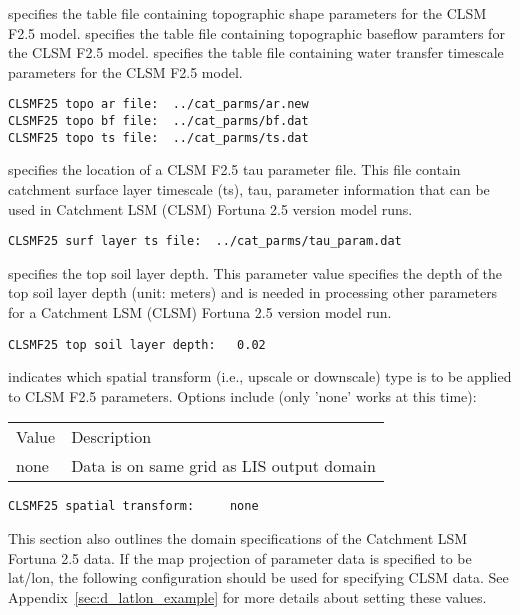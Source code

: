   specifies the table file containing 
   topographic shape parameters for the CLSM F2.5 model.
  specifies the table file containing
   topographic baseflow paramters for the CLSM F2.5 model.
  specifies the table file containing
   water transfer timescale parameters for the CLSM F2.5 model.

 

 \begin{Verbatim}[frame=single]
CLSMF25 topo ar file:  ../cat_parms/ar.new
CLSMF25 topo bf file:  ../cat_parms/bf.dat
CLSMF25 topo ts file:  ../cat_parms/ts.dat
 \end{Verbatim}

 
  specifies the location of a
 CLSM F2.5 tau parameter file.  This file contain catchment surface
 layer timescale (ts), tau, parameter information that can be used
 in Catchment LSM (CLSM) Fortuna 2.5 version model runs.
 

 \begin{Verbatim}[frame=single]
CLSMF25 surf layer ts file:  ../cat_parms/tau_param.dat
 \end{Verbatim}

 
  specifies the top soil layer
 depth.  This parameter value specifies the depth of the top soil
 layer depth (unit: meters) and is needed in processing other
 parameters for a Catchment LSM (CLSM) Fortuna 2.5 version model run.
 

 \begin{Verbatim}[frame=single]
CLSMF25 top soil layer depth:   0.02 
 \end{Verbatim}

 
  indicates which spatial transform
 (i.e., upscale or downscale) type is to be applied to CLSM F2.5
 parameters.
 Options include (only 'none' works at this time):

 \begin{tabular}{ll}
 Value   & Description                  \\
 none    &  Data is on same grid as LIS output domain \\
 \end{tabular}
 
 \begin{Verbatim}[frame=single]
CLSMF25 spatial transform:     none
 \end{Verbatim}

 
 This section also outlines the domain specifications of the
 Catchment LSM Fortuna 2.5 data.
 If the map projection of parameter data is specified to be lat/lon,
 the following configuration should be used for specifying CLSM data.
 See Appendix~\ref{sec:d_latlon_example} for more details about
 setting these values.
 
